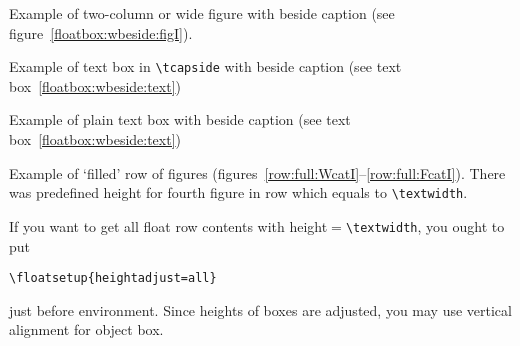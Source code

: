 \Text

\fi

\clearpage
Example of two-column or wide figure with beside caption (see figure~\ref{floatbox:wbeside:figI}).

\begin{figure*}[!t]
{\caption{Wide beside caption width of object equals to width of
graphics. \text}%
\label{floatbox:wbeside:figI}}
\end{figure*}

\Text

\clearpage
Example of text box in \verb|\tcapside| with beside caption (see text box~\ref{floatbox:wbeside:text})

\begin{textbox*}
\tcapside[1.2\hsize]
{\TEXTBOX}
{\caption{Wide beside caption with of object box equals to 1.2``column'' width. \text}%
\label{floatbox:wbeside:text}}
\end{textbox*}

\Text

\clearpage
Example of plain text box with beside caption (see text box~\ref{floatbox:wbeside:text})

\begin{textbox*}
{\TEXTBOX}
{\caption{Wide beside caption with of object box equals to 1.2``column'' width. \text}%
\label{floatbox:wbeside:text}}
\end{textbox*}

\Text

\clearpage
Example of `filled' row of figures
(figures~\ref{row:full:WcatI}--\ref{row:full:FcatI}).
There was predefined height for fourth figure in row which equals to
\verb|\textwidth|.

If you want to get all float row contents with height${}={}$\verb|\textwidth|, you ought to put
\begin{verbatim}
\floatsetup{heightadjust=all}
\end{verbatim}
just before  environment. Since heights of boxes are adjusted,
you may use vertical alignment for object box.

